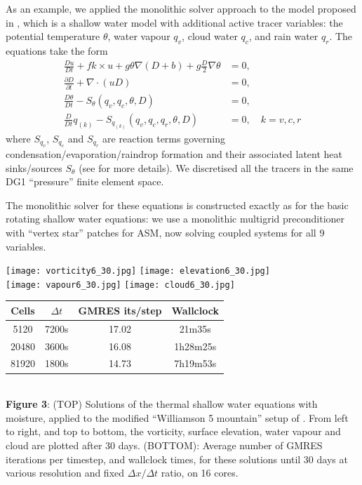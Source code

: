 \documentclass[
]{ImperialPoster}
\newcommand{\pp}[2]{\frac{\partial #1}{\partial #2}}
\newcommand{\DD}[2]{\frac{D #1}{D #2}}
\begin{document}
\begin{multicols}{3}
As an example, we applied the monolithic solver approach
to the model proposed in \cite{zerroukat2015moist}, which is a shallow
water model with additional active tracer variables: the potential
temperature $\theta$, water vapour $q_v$, cloud water $q_c$, and rain
water $q_r$. The equations take the form
\begin{align*}
  \DD{u}{t} + fk\times u + g\theta \nabla (D+b) + g\frac{D}{2}\nabla \theta
  & = 0, \\
  \pp{D}{t} + \nabla\cdot(uD) & = 0, \\
  \DD{\theta}{t} - S_\theta(q_v, q_c, \theta, D) & = 0, \\
  \DD{}{t}q_{(k)} - S_{q_{(k)}}(q_v, q_c, q_r, \theta, D) & = 0, \quad
  k=v,c,r
\end{align*}
where $S_{q_v}$, $S_{q_c}$ and $S_{q_r}$ are reaction terms governing
condensation/evaporation/raindrop formation and their associated
latent heat sinks/sources $S_\theta$ (see \cite{zerroukat2015moist}
for more details). We discretised all the tracers in the same DG1
``pressure'' finite element space.

The monolithic solver for these equations is constructed exactly as for
the basic rotating shallow water equations: we use a monolithic multigrid
preconditioner with ``vertex star'' patches for ASM, now solving coupled
systems for all 9 variables. 

\begin{center}
  \texttt{[image: vorticity6\_30.jpg]}
  \texttt{[image: elevation6\_30.jpg]}
  \\
  \texttt{[image: vapour6\_30.jpg]}
  \texttt{[image: cloud6\_30.jpg]}
  \\
  \begin{tabular}{cccc}
    Cells & $\Delta t$ & GMRES its/step & Wallclock \\
    \hline
    5120 & 7200s & 17.02 & 21m35s \\
    20480 & 3600s & 16.08 & 1h28m25s \\
    81920 & 1800s & 14.73 & 7h19m53s \\
  \end{tabular} \\
    \vspace{3mm}
                {\bfseries Figure 3}: (TOP) Solutions of the thermal
                shallow water equations with moisture, applied to the
                modified ``Williamson 5 mountain'' setup of
                \cite{zerroukat2015moist}. From left to right, and top
                to bottom, the vorticity, surface elevation, water vapour
                and cloud are plotted after 30 days.
                (BOTTOM): Average number of GMRES iterations per timestep,
                and wallclock times, for these solutions until 30
                days at various resolution and fixed $\Delta x/\Delta t$
                ratio, on 16 cores.
  \end{center}


\end{multicols}
\end{document}
